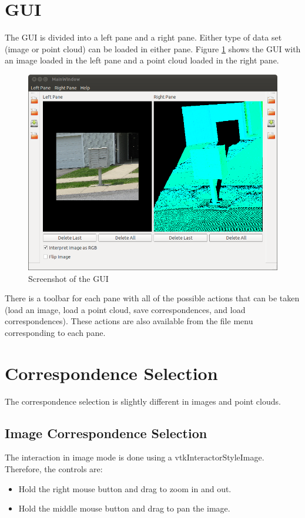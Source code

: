 \documentclass{InsightArticle}
\begin{document}
\section{GUI}
\label{sec:GUI}

The GUI is divided into a left pane and a right pane. Either type of data set (image or point cloud) can be loaded in either pane. Figure \ref{fig:GUI} shows the GUI with an image loaded in the left pane and a point cloud loaded in the right pane.

\begin{center}
  \begin{figure}[H]
  \centering
    \includegraphics[width=0.6\linewidth]{images/GUI}
    \caption{Screenshot of the GUI}
    \label{fig:GUI}
  \end{figure}
\end{center} 

There is a toolbar for each pane with all of the possible actions that can be taken (load an image, load a point cloud, save correspondences, and load correspondences). These actions are also available from the file menu corresponding to each pane.

\section{Correspondence Selection}
The correspondence selection is slightly different in images and point clouds.

\subsection{Image Correspondence Selection}
The interaction in image mode is done using a vtkInteractorStyleImage. Therefore, the controls are:
\begin{itemize}
 \item Hold the right mouse button and drag to zoom in and out.
 \item Hold the middle mouse button and drag to pan the image.
\end{itemize}
\end{document}
